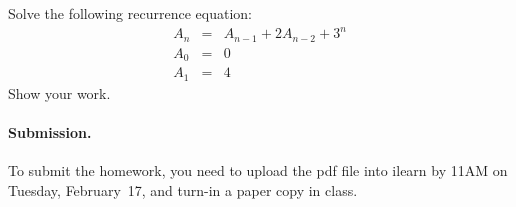 
\begin{problem}
Solve the following recurrence equation:
%
\begin{eqnarray*}
        A_n &=& A_{n-1} + 2A_{n-2} + 3^n\\
        A_0 &=& 0 \\
        A_1 &=& 4
\end{eqnarray*}
%
Show your work.
\end{problem}

\vskip 0.1in
\paragraph{Submission.}
To submit the homework, you need to upload the pdf file into ilearn by 11AM on Tuesday, February~17,
and turn-in a paper copy in class.

